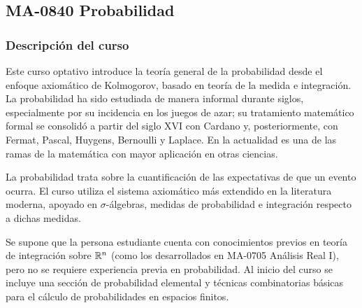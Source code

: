 \newpage
\subsection*{MA-0840 Probabilidad}

\hypertarget{MA0840}{}
\begin{refsection}
\begin{table}[H]
\end{table}

\subsubsection*{Descripción del curso}

Este curso optativo introduce la teoría general de la probabilidad desde el enfoque axiomático de Kolmogorov, basado en teoría de la medida e integración. La probabilidad ha sido estudiada de manera informal durante siglos, especialmente por su incidencia en los juegos de azar; su tratamiento matemático formal se consolidó a partir del siglo XVI con Cardano y, posteriormente, con Fermat, Pascal, Huygens, Bernoulli y Laplace. En la actualidad es una de las ramas de la matemática con mayor aplicación en otras ciencias.

La probabilidad trata sobre la cuantificación de las expectativas de que un evento ocurra. El curso utiliza el sistema axiomático más extendido en la literatura moderna, apoyado en $\sigma$-álgebras, medidas de probabilidad e integración respecto a dichas medidas.

Se supone que la persona estudiante cuenta con conocimientos previos en teoría de integración sobre $\mathbb{R}^n$ (como los desarrollados en MA-0705 Análisis Real I), pero no se requiere experiencia previa en probabilidad. Al inicio del curso se incluye una sección de probabilidad elemental y técnicas combinatorias básicas para el cálculo de probabilidades en espacios finitos.


\end{refsection}

